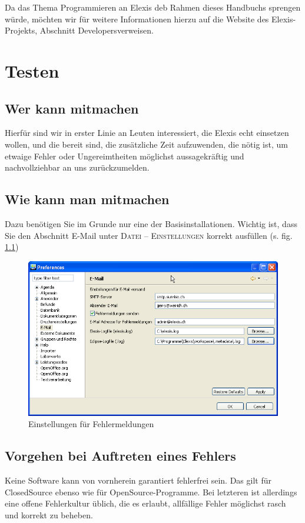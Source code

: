 Da das Thema \glqq Programmieren an Elexis\grqq{} deb Rahmen dieses Handbuchs
sprengen würde, möchten wir für weitere Informationen hierzu auf die Website des
Elexis-Projekts, Abschnitt \glqq Developers\grqq{}verweisen.

\chapter{Testen}
\section{Wer kann mitmachen}
Hierfür sind wir in erster Linie an Leuten interessiert, die Elexis \glqq
echt\grqq{} einsetzen wollen, und die bereit sind, die zusätzliche Zeit
aufzuwenden, die nötig ist, um etwaige Fehler oder Ungereimtheiten möglichst
aussagekräftig und nachvollziehbar an uns zurückzumelden.
\section{Wie kann man mitmachen}
Dazu benötigen Sie im Grunde nur eine der Basisinstallationen. Wichtig ist, dass
Sie den Abschnitt \glqq E-Mail\grqq{} unter \textsc{Datei -- Einstellungen}
korrekt ausfüllen (s. fig. \ref{fig:mailsettings})
\begin{figure}[htp]
\begin{center}
  \includegraphics[width=150mm]{images/mailsettings}
  \caption{Einstellungen für Fehlermeldungen}
  \label{fig:mailsettings}
\end{center}
\end{figure}
\section{Vorgehen bei Auftreten eines Fehlers}
Keine Software kann von vornherein garantiert fehlerfrei sein. Das gilt für
ClosedSource ebenso wie für OpenSource-Programme. Bei letzteren ist allerdings
eine offene Fehlerkultur üblich, die es erlaubt, allfällige Fehler möglichst
rasch und korrekt zu beheben.
